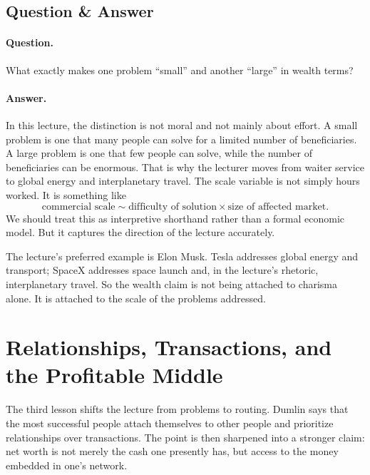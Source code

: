 \subsection{Question \& Answer}

\paragraph{Question.} What exactly makes one problem ``small'' and another ``large'' in wealth terms?

\paragraph{Answer.} In this lecture, the distinction is not moral and not mainly about effort. A small problem is one that many people can solve for a limited number of beneficiaries. A large problem is one that few people can solve, while the number of beneficiaries can be enormous. That is why the lecturer moves from waiter service to global energy and interplanetary travel. The scale variable is not simply hours worked. It is something like
\begin{equation}
\text{commercial scale} \sim \text{difficulty of solution} \times \text{size of affected market}.
\end{equation}
We should treat this as interpretive shorthand rather than a formal economic model. But it captures the direction of the lecture accurately.

The lecture's preferred example is Elon Musk. Tesla addresses global energy and transport; SpaceX addresses space launch and, in the lecture's rhetoric, interplanetary travel. So the wealth claim is not being attached to charisma alone. It is attached to the scale of the problems addressed.

\section{Relationships, Transactions, and the Profitable Middle}

The third lesson shifts the lecture from problems to routing. Dumlin says that the most successful people attach themselves to other people and prioritize relationships over transactions. The point is then sharpened into a stronger claim: net worth is not merely the cash one presently has, but access to the money embedded in one's network.

